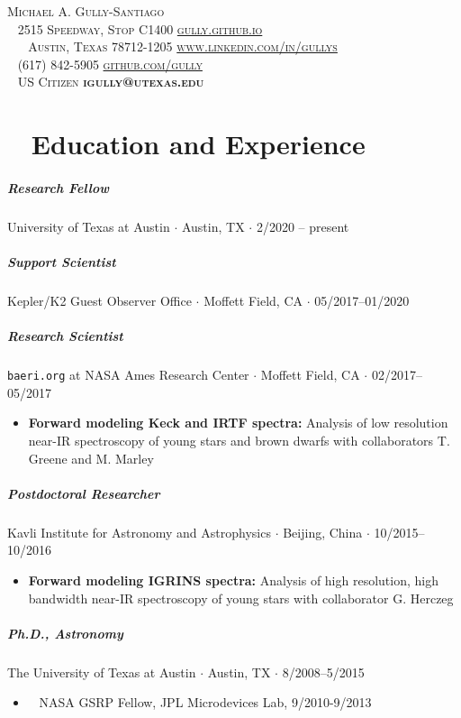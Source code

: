 \documentclass[10pt,letterpaper]{article}
\newcommand{\namestyle}{\Huge \scshape}
\newcommand{\addressstyle}{\color{addresscolor}  \footnotesize \sffamily \upshape}
\begin{document}
\begin{flushleft}
    \namestyle Michael A. Gully-Santiago \\[0.3em]
    \addressstyle
    \faMapMarked* ~ 2515 Speedway, Stop C1400  \hfill \url{gully.github.io} ~ \faLink \\
    ~ ~ Austin, Texas 78712-1205  \hfill  \url{www.linkedin.com/in/gullys} ~ \faLinkedinIn \\
    \faPhone ~ (617) 842-5905 \hfill \url{github.com/gully} ~ \faGithub \\
    \faFlagUsa ~ US Citizen \hfill \textbf{igully@utexas.edu} ~ \faAt\\

\end{flushleft}

\small

\section*{\faUniversity ~ Education and Experience}

\subparagraph{Research Fellow}
University of Texas at Austin $\cdot$ Austin, TX $\cdot$  2/2020 -- present

\subparagraph{Support Scientist}
Kepler/K2 Guest Observer Office $\cdot$ Moffett Field, CA $\cdot$ 05/2017--01/2020

\subparagraph{Research Scientist}
\texttt{baeri.org} at NASA Ames Research Center $\cdot$ Moffett Field, CA $\cdot$ 02/2017--05/2017
\begin{itemize}
    \item  \textbf{Forward modeling Keck and IRTF spectra:} Analysis of low resolution near-IR spectroscopy of young stars and brown dwarfs with collaborators T. Greene and M. Marley
\end{itemize}

\subparagraph{Postdoctoral Researcher}
Kavli Institute for Astronomy and Astrophysics $\cdot$ Beijing, China $\cdot$ 10/2015--10/2016
\begin{itemize}
    \item  \textbf{Forward modeling IGRINS spectra:} Analysis of high resolution, high bandwidth near-IR spectroscopy of young stars with collaborator G. Herczeg
\end{itemize}


\subparagraph{\textbf{Ph.D}., Astronomy}
The University of Texas at Austin $\cdot$ Austin, TX $\cdot$ 8/2008--5/2015
\begin{itemize}
    \item \faRocket ~ NASA GSRP Fellow, JPL Microdevices Lab, 9/2010-9/2013
\end{itemize}
\end{document}
